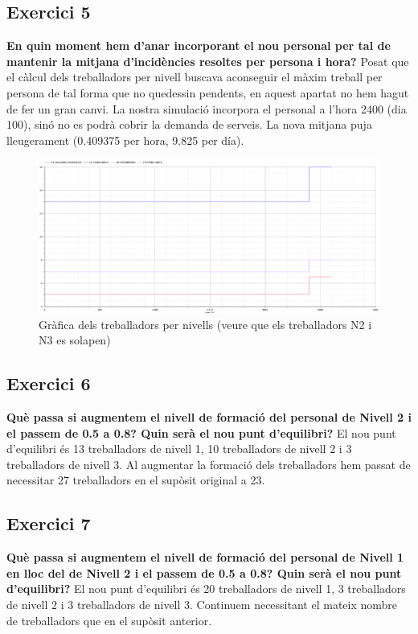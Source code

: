 \documentclass[8pt]{beamer}
\begin{document}
\begin{frame}
\subsection{Exercici 5}
\textbf{En quin moment hem d’anar incorporant el nou personal per tal de mantenir la mitjana
d’incidències resoltes per persona i hora?}
\newline
\newline
Posat que el càlcul dels treballadors per nivell buscava aconseguir el màxim treball per persona de tal forma que no quedessin pendents, en aquest apartat no hem hagut de fer un gran canvi.
La nostra simulació incorpora el personal a l'hora 2400 (dia 100), sinó no es podrà cobrir la demanda de serveis.
La nova mitjana puja lleugerament (0.409375 per hora, 9.825 per día).
\begin{figure}[h!]
  \includegraphics[width=\linewidth]{ex5.png}
  \caption{Gràfica dels treballadors per nivells (veure que els treballadors N2 i N3 es solapen)}
  \label{fig:plot1}
\end{figure}
\end{frame}
\begin{frame}
\subsection{Exercici 6}
\textbf{ Què passa si augmentem el nivell de formació del personal de Nivell 2 i el passem de 0.5
a 0.8? Quin serà el nou punt d’equilibri?}
\newline
\newline
El nou punt d'equilibri és 13 treballadors de nivell 1, 10 treballadors de nivell 2 i 3 treballadors de nivell 3.
\newline Al augmentar la formació dels treballadors hem passat de necessitar 27 treballadors en el supòsit original a 23.
\end{frame}
\begin{frame}
\subsection{Exercici 7}
\textbf{Què passa si augmentem el nivell de formació del personal de Nivell 1 en lloc del de Nivell
2 i el passem de 0.5 a 0.8? Quin serà el nou punt d’equilibri?}
\newline
\newline
El nou punt d'equilibri és 20 treballadors de nivell 1, 3 treballadors de nivell 2 i 3 treballadors de nivell 3.
\newline Continuem necessitant el mateix nombre de treballadors que en el supòsit anterior.
\end{frame}
\end{document}
